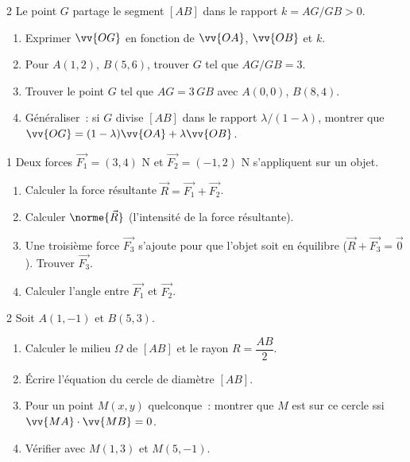 \begin{probleme}{2}
Le point $G$ partage le segment $[AB]$ dans le rapport $k = AG/GB > 0$.
\begin{enumerate}
  \item Exprimer $\vv{OG}$ en fonction de $\vv{OA}$, $\vv{OB}$ et $k$.
  \item Pour $A(1,2)$, $B(5,6)$, trouver $G$ tel que $AG/GB = 3$.
  \item Trouver le point $G$ tel que $AG = 3\,GB$ avec $A(0,0)$, $B(8,4)$.
  \item G\'en\'eraliser~: si $G$ divise $[AB]$ dans le rapport $\lambda/(1-\lambda)$,
        montrer que $\vv{OG} = (1-\lambda)\vv{OA}+\lambda\vv{OB}$.
\end{enumerate}
\end{probleme}

\begin{probleme}{1}
Deux forces $\vec{F_1}=(3,4)$ N et $\vec{F_2}=(-1,2)$ N s'appliquent
sur un objet.
\begin{enumerate}
  \item Calculer la force r\'esultante $\vec{R}=\vec{F_1}+\vec{F_2}$.
  \item Calculer $\norme{\vec{R}}$ (l'intensit\'e de la force r\'esultante).
  \item Une troisi\`eme force $\vec{F_3}$ s'ajoute pour que l'objet soit
        en \'equilibre ($\vec{R}+\vec{F_3}=\vec{0}$). Trouver $\vec{F_3}$.
  \item Calculer l'angle entre $\vec{F_1}$ et $\vec{F_2}$.
\end{enumerate}
\end{probleme}

\begin{probleme}{2}
Soit $A(1,-1)$ et $B(5,3)$.
\begin{enumerate}
  \item Calculer le milieu $\Omega$ de $[AB]$ et le rayon $R = \dfrac{AB}{2}$.
  \item \'Ecrire l'\'equation du cercle de diam\`etre $[AB]$.
  \item Pour un point $M(x,y)$ quelconque~:
        montrer que $M$ est sur ce cercle ssi $\vv{MA}\cdot\vv{MB}=0$.
  \item V\'erifier avec $M(1,3)$ et $M(5,-1)$.
\end{enumerate}
\end{probleme}

